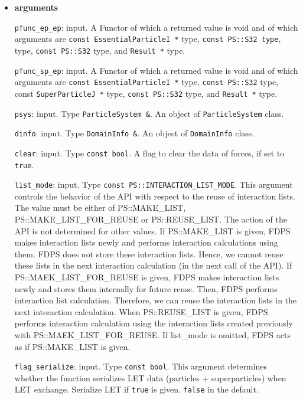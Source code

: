 \begin{itemize}

\item {\bf arguments}

{\tt pfunc\_ep\_ep}: input. A Functor of which a returned value is
void and of which arguments are {\tt const EssentialParticleI *} type, {\tt const PS::S32 type},  type, {\tt const PS::S32} type, and {\tt Result *} type.

{\tt pfunc\_sp\_ep}: input. A Functor of which a returned value is
void and of which arguments are {\tt const EssentialParticleI *} type, {\tt const PS::S32} type, \newline const {\tt SuperParticleJ *} type, {\tt const PS::S32} type, and {\tt Result *} type.

{\tt psys}: input. Type {\tt ParticleSystem \&}. An object of {\tt ParticleSystem} class.

{\tt dinfo}: input. Type {\tt DomainInfo \&}. An object of {\tt DomainInfo} class.

{\tt clear}: input. Type {\tt const bool}. A flag to clear the data of forces, if set to {\tt true}.

{\tt list\_mode}: input. Type {\tt const PS::INTERACTION\_LIST\_MODE}. This argument controls the behavior of the API with respect to the reuse of interaction lists. The value must be either of PS::MAKE\_LIST, PS::MAKE\_LIST\_FOR\_REUSE or PS::REUSE\_LIST. The action of the API is not determined for other values. If PS::MAKE\_LIST is given, FDPS makes interaction lists newly and performs interaction calculations using them. FDPS does not store these interaction lists. Hence, we cannot reuse these lists in the next interaction calculation (in the next call of the API). If PS::MAEK\_LIST\_FOR\_REUSE is given, FDPS makes interaction lists newly and stores them internally for future reuse. Then, FDPS performs interaction list calculation. Therefore, we can reuse the interaction lists in the next interaction calculation. When PS::REUSE\_LIST is given, FDPS performs interaction calculation using the interaction lists created previously with PS::MAEK\_LIST\_FOR\_REUSE. If list\_mode is omitted, FDPS acts as if PS::MAKE\_LIST is given.

\texttt{flag\_serialize}: input. Type \texttt{const bool}. This argument determines whether the function serializes LET data  (particles + superparticles) when LET exchange. Serialize LET if \texttt{true} is given. \texttt{false} in the default.



\end{itemize}
